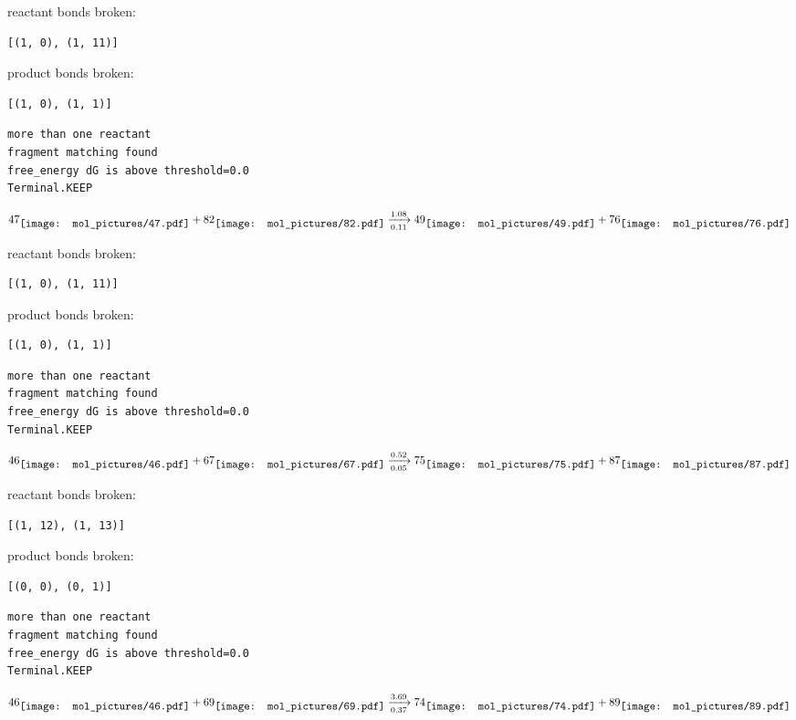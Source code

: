 \documentclass{article}
\begin{document}
reactant bonds broken:\begin{verbatim}
[(1, 0), (1, 11)]
\end{verbatim}
product bonds broken:\begin{verbatim}
[(1, 0), (1, 1)]
\end{verbatim}




\vspace{1cm}
\begin{verbatim}
more than one reactant
fragment matching found
free_energy dG is above threshold=0.0
Terminal.KEEP
\end{verbatim}
$$
47
\raisebox{-.5\height}{\texttt{[image: mol\_pictures/47.pdf]}}
+
82
\raisebox{-.5\height}{\texttt{[image: mol\_pictures/82.pdf]}}
\xrightarrow[0.11]{1.08}
49
\raisebox{-.5\height}{\texttt{[image: mol\_pictures/49.pdf]}}
+
76
\raisebox{-.5\height}{\texttt{[image: mol\_pictures/76.pdf]}}
$$


reactant bonds broken:\begin{verbatim}
[(1, 0), (1, 11)]
\end{verbatim}
product bonds broken:\begin{verbatim}
[(1, 0), (1, 1)]
\end{verbatim}




\vspace{1cm}
\begin{verbatim}
more than one reactant
fragment matching found
free_energy dG is above threshold=0.0
Terminal.KEEP
\end{verbatim}
$$
46
\raisebox{-.5\height}{\texttt{[image: mol\_pictures/46.pdf]}}
+
67
\raisebox{-.5\height}{\texttt{[image: mol\_pictures/67.pdf]}}
\xrightarrow[0.05]{0.52}
75
\raisebox{-.5\height}{\texttt{[image: mol\_pictures/75.pdf]}}
+
87
\raisebox{-.5\height}{\texttt{[image: mol\_pictures/87.pdf]}}
$$


reactant bonds broken:\begin{verbatim}
[(1, 12), (1, 13)]
\end{verbatim}
product bonds broken:\begin{verbatim}
[(0, 0), (0, 1)]
\end{verbatim}




\vspace{1cm}
\begin{verbatim}
more than one reactant
fragment matching found
free_energy dG is above threshold=0.0
Terminal.KEEP
\end{verbatim}
$$
46
\raisebox{-.5\height}{\texttt{[image: mol\_pictures/46.pdf]}}
+
69
\raisebox{-.5\height}{\texttt{[image: mol\_pictures/69.pdf]}}
\xrightarrow[0.37]{3.69}
74
\raisebox{-.5\height}{\texttt{[image: mol\_pictures/74.pdf]}}
+
89
\raisebox{-.5\height}{\texttt{[image: mol\_pictures/89.pdf]}}
$$
\end{document}
